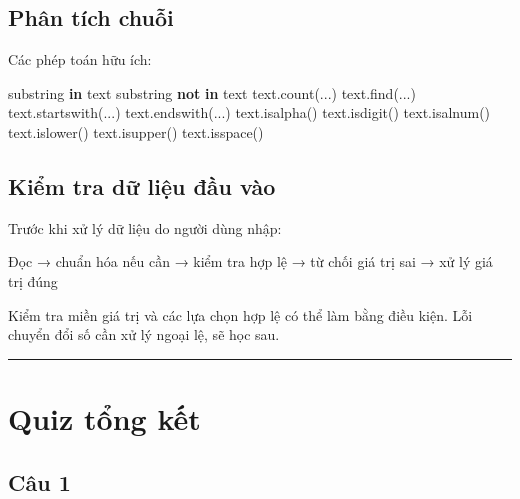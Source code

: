 \documentclass[
  11pt,
  a4paper,
]{article}
\newenvironment{Shaded}{}{}
\newcommand{\KeywordTok}[1]{\textcolor[rgb]{0.00,0.44,0.13}{\textbf{#1}}}
\newcommand{\NormalTok}[1]{#1}
\begin{document}
\subsection{Phân tích chuỗi}\label{phuxe2n-tuxedch-chuux1ed7i-1}

Các phép toán hữu ích:

\begin{Shaded}
\begin{Highlighting}[]
\NormalTok{substring }\KeywordTok{in}\NormalTok{ text}
\NormalTok{substring }\KeywordTok{not} \KeywordTok{in}\NormalTok{ text}
\NormalTok{text.count(...)}
\NormalTok{text.find(...)}
\NormalTok{text.startswith(...)}
\NormalTok{text.endswith(...)}
\NormalTok{text.isalpha()}
\NormalTok{text.isdigit()}
\NormalTok{text.isalnum()}
\NormalTok{text.islower()}
\NormalTok{text.isupper()}
\NormalTok{text.isspace()}
\end{Highlighting}
\end{Shaded}

\subsection{Kiểm tra dữ liệu đầu
vào}\label{kiux1ec3m-tra-dux1eef-liux1ec7u-ux111ux1ea7u-vuxe0o}

Trước khi xử lý dữ liệu do người dùng nhập:

\begin{Shaded}
\begin{Highlighting}[]
\NormalTok{Đọc}
\NormalTok{→ chuẩn hóa nếu cần}
\NormalTok{→ kiểm tra hợp lệ}
\NormalTok{→ từ chối giá trị sai}
\NormalTok{→ xử lý giá trị đúng}
\end{Highlighting}
\end{Shaded}

Kiểm tra miền giá trị và các lựa chọn hợp lệ có thể làm bằng điều kiện.
Lỗi chuyển đổi số cần xử lý ngoại lệ, sẽ học sau.

\begin{center}\rule{0.5\linewidth}{0.5pt}\end{center}

\section{Quiz tổng kết}\label{quiz-tux1ed5ng-kux1ebft}

\subsection{Câu 1}\label{cuxe2u-1-8}
\end{document}
